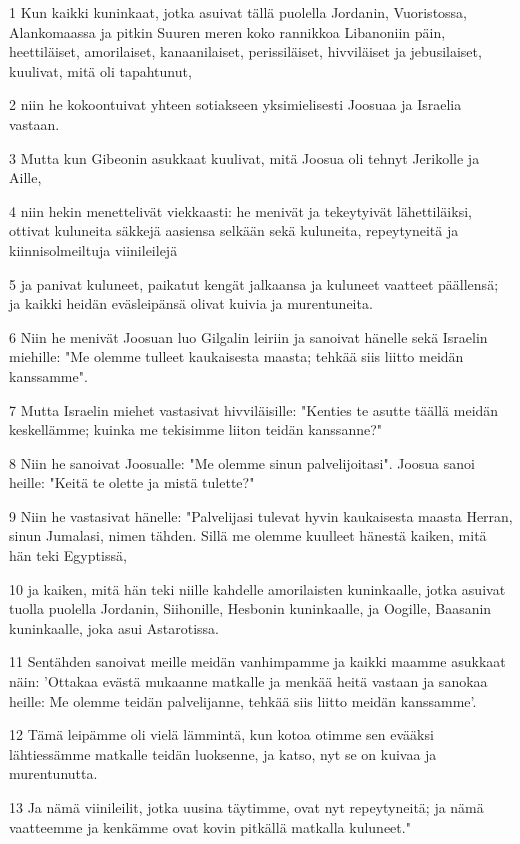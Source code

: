 \par 1 Kun kaikki kuninkaat, jotka asuivat tällä puolella Jordanin, Vuoristossa, Alankomaassa ja pitkin Suuren meren koko rannikkoa Libanoniin päin, heettiläiset, amorilaiset, kanaanilaiset, perissiläiset, hivviläiset ja jebusilaiset, kuulivat, mitä oli tapahtunut,
\par 2 niin he kokoontuivat yhteen sotiakseen yksimielisesti Joosuaa ja Israelia vastaan.
\par 3 Mutta kun Gibeonin asukkaat kuulivat, mitä Joosua oli tehnyt Jerikolle ja Aille,
\par 4 niin hekin menettelivät viekkaasti: he menivät ja tekeytyivät lähettiläiksi, ottivat kuluneita säkkejä aasiensa selkään sekä kuluneita, repeytyneitä ja kiinnisolmeiltuja viinileilejä
\par 5 ja panivat kuluneet, paikatut kengät jalkaansa ja kuluneet vaatteet päällensä; ja kaikki heidän eväsleipänsä olivat kuivia ja murentuneita.
\par 6 Niin he menivät Joosuan luo Gilgalin leiriin ja sanoivat hänelle sekä Israelin miehille: "Me olemme tulleet kaukaisesta maasta; tehkää siis liitto meidän kanssamme".
\par 7 Mutta Israelin miehet vastasivat hivviläisille: "Kenties te asutte täällä meidän keskellämme; kuinka me tekisimme liiton teidän kanssanne?"
\par 8 Niin he sanoivat Joosualle: "Me olemme sinun palvelijoitasi". Joosua sanoi heille: "Keitä te olette ja mistä tulette?"
\par 9 Niin he vastasivat hänelle: "Palvelijasi tulevat hyvin kaukaisesta maasta Herran, sinun Jumalasi, nimen tähden. Sillä me olemme kuulleet hänestä kaiken, mitä hän teki Egyptissä,
\par 10 ja kaiken, mitä hän teki niille kahdelle amorilaisten kuninkaalle, jotka asuivat tuolla puolella Jordanin, Siihonille, Hesbonin kuninkaalle, ja Oogille, Baasanin kuninkaalle, joka asui Astarotissa.
\par 11 Sentähden sanoivat meille meidän vanhimpamme ja kaikki maamme asukkaat näin: 'Ottakaa evästä mukaanne matkalle ja menkää heitä vastaan ja sanokaa heille: Me olemme teidän palvelijanne, tehkää siis liitto meidän kanssamme'.
\par 12 Tämä leipämme oli vielä lämmintä, kun kotoa otimme sen evääksi lähtiessämme matkalle teidän luoksenne, ja katso, nyt se on kuivaa ja murentunutta.
\par 13 Ja nämä viinileilit, jotka uusina täytimme, ovat nyt repeytyneitä; ja nämä vaatteemme ja kenkämme ovat kovin pitkällä matkalla kuluneet."
